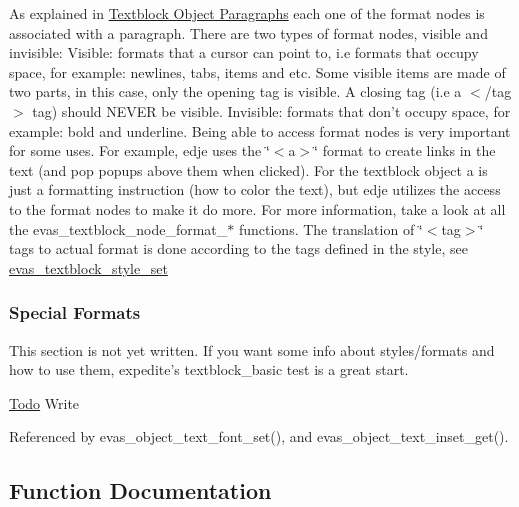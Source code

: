 As explained in \hyperlink{group__Evas__Object__Textblock_textblock_paragraphs}{Textblock Object Paragraphs} each one of the format nodes is associated with a paragraph. There are two types of format nodes, visible and invisible: Visible: formats that a cursor can point to, i.e formats that occupy space, for example: newlines, tabs, items and etc. Some visible items are made of two parts, in this case, only the opening tag is visible. A closing tag (i.e a $<$/tag$>$ tag) should NEVER be visible. Invisible: formats that don't occupy space, for example: bold and underline. Being able to access format nodes is very important for some uses. For example, edje uses the \char`\"{}$<$a$>$\char`\"{} format to create links in the text (and pop popups above them when clicked). For the textblock object a is just a formatting instruction (how to color the text), but edje utilizes the access to the format nodes to make it do more. For more information, take a look at all the evas\_\-textblock\_\-node\_\-format\_\-$\ast$ functions. The translation of \char`\"{}$<$tag$>$\char`\"{} tags to actual format is done according to the tags defined in the style, see \hyperlink{group__Evas__Object__Textblock_gac239e4649b0893284ea962a2183c3f14}{evas\_\-textblock\_\-style\_\-set}\hypertarget{group__Evas__Object__Textblock_textblock_special_formats}{}\subsubsection{Special Formats}\label{group__Evas__Object__Textblock_textblock_special_formats}
This section is not yet written. If you want some info about styles/formats and how to use them, expedite's textblock\_\-basic test is a great start. \begin{Desc}
\item[\hyperlink{todo__todo000004}{Todo}]Write  \end{Desc}


Referenced by evas\_\-object\_\-text\_\-font\_\-set(), and evas\_\-object\_\-text\_\-inset\_\-get().



\subsection{Function Documentation}
